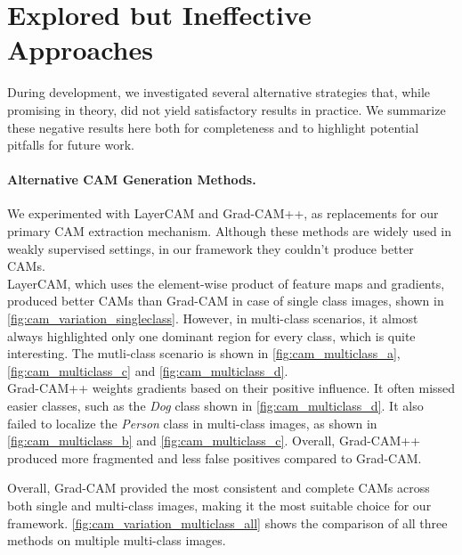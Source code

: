 
\section{Explored but Ineffective Approaches}
\label{sec:ineffective_approaches}

During development, we investigated several alternative strategies that, while promising in theory, did not yield satisfactory results in practice. We summarize these negative results here both for completeness and to highlight potential pitfalls for future work.  

\paragraph{Alternative CAM Generation Methods.} 
We experimented with LayerCAM and Grad-CAM++, as replacements for our primary CAM extraction mechanism. Although these methods are widely used in weakly supervised settings, in our framework they couldn't produce better CAMs. \\
LayerCAM, which uses the element-wise product of feature maps and gradients, produced better CAMs than Grad-CAM in case of single class images, shown in \autoref{fig:cam_variation_singleclass}. However, in multi-class scenarios, it almost always highlighted only one dominant region for every class, which is quite interesting. The mutli-class scenario is shown in \autoref{fig:cam_multiclass_a}, \autoref{fig:cam_multiclass_c} and \autoref{fig:cam_multiclass_d}. \\
Grad-CAM++ weights gradients based on their positive influence. It often missed easier classes, such as the \textit{Dog} class shown in \autoref{fig:cam_multiclass_d}. It also failed to localize the \textit{Person} class in multi-class images, as shown in \autoref{fig:cam_multiclass_b} and \autoref{fig:cam_multiclass_c}. Overall, Grad-CAM++ produced more fragmented and less false positives compared to Grad-CAM.

Overall, Grad-CAM provided the most consistent and complete CAMs across both single and multi-class images, making it the most suitable choice for our framework. \autoref{fig:cam_variation_multiclass_all} shows the comparison of all three methods on multiple multi-class images.

